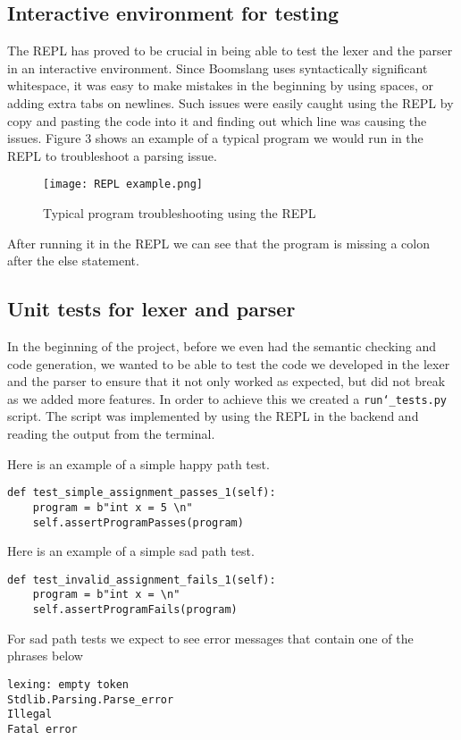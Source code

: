 \documentclass{article}
\begin{document}
\subsection{Interactive environment for testing}
The REPL has proved to be crucial in being able to test the lexer and the parser in an interactive environment. Since Boomslang uses syntactically significant whitespace, it was easy to make mistakes in the beginning by using spaces, or adding extra tabs on newlines. Such issues were easily caught using the REPL by copy and pasting the code into it and finding out which line was causing the issues. Figure 3 shows an example of a typical program we would run in the REPL to troubleshoot a parsing issue.
\begin{figure}[h]
\caption{Typical program troubleshooting using the REPL}
\centering
\texttt{[image: REPL example.png]}
\label{fig:sast}
\end{figure}

After running it in the REPL we can see that the program is missing a colon after the else statement. 

\subsection{Unit tests for lexer and parser}
In the beginning of the project, before we even had the semantic checking and code generation, we wanted to be able to test the code we developed in the lexer and the parser to ensure that it not only worked as expected, but did not break as we added more features. In order to achieve this we created a \texttt{run\char`_tests.py} script. The script was implemented by using the REPL in the backend and reading the output from the terminal.

Here is an example of a simple happy path test.
\begin{verbatim}
def test_simple_assignment_passes_1(self):
    program = b"int x = 5 \n"
    self.assertProgramPasses(program)
\end{verbatim}

Here is an example of a simple sad path test.
\begin{verbatim}
def test_invalid_assignment_fails_1(self):
    program = b"int x = \n"
    self.assertProgramFails(program)
\end{verbatim}

For sad path tests we expect to see error messages that contain one of the phrases below
\begin{verbatim}
lexing: empty token
Stdlib.Parsing.Parse_error
Illegal
Fatal error
\end{verbatim}
\end{document}
